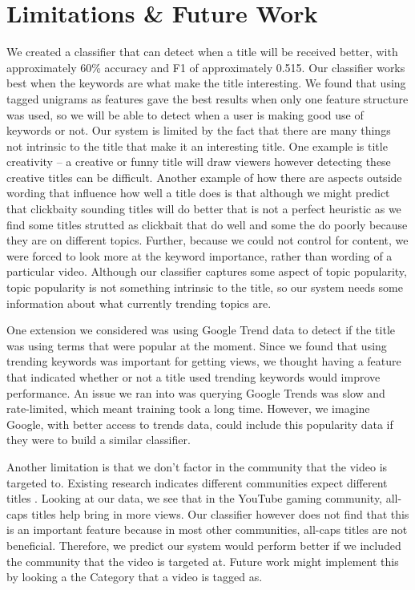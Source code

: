 \documentclass[a4paper,12pt]{article}
\begin{document}
\section{Limitations \& Future Work}
We created a classifier that can detect when a title will be received better, with approximately 60\% accuracy and F1 of approximately 0.515. Our classifier works best when the keywords are what make the title interesting. We found that using tagged unigrams as features gave the best results when only one feature structure was used, so we will be able to detect when a user is making good use of keywords or not. Our system is limited by the fact that there are many things not intrinsic to the title that make it an interesting title. One example is title creativity -- a creative or funny title will draw viewers however detecting these creative titles can be difficult. Another example of how there are aspects outside wording that influence how well a title does is that although we might predict that clickbaity sounding titles will do better that is not a perfect heuristic as we find some titles strutted as clickbait that do well and some the do poorly because they are on different topics. Further, because we could not control for content, we were forced to look more at the keyword importance, rather than wording of a particular video. Although our classifier captures some aspect of topic popularity, topic popularity is not something intrinsic to the title, so our system needs some information about what currently trending topics are.

One extension we considered was using Google Trend data to detect if the title was using terms that were popular at the moment. Since we found that using trending keywords was important for getting views, we thought having a feature that indicated whether or not a title used trending keywords would improve performance. An issue we ran into was querying Google Trends was slow and rate-limited, which meant training took a long time. However, we imagine Google, with better access to trends data, could include this popularity data if they were to build a similar classifier. 

Another limitation is that we don't factor in the community that the video is targeted to. Existing research indicates different communities expect different titles \cite{himabindu+mcauley+leskovec:13}. Looking at our data, we see that in the YouTube gaming community, all-caps titles help bring in more views. Our classifier however does not find that this is an important feature because in most other communities, all-caps titles are not beneficial. Therefore, we predict our system would perform better if we included the community that the video is targeted at. Future work might implement this by looking a the Category that a video is tagged as.
\end{document}
